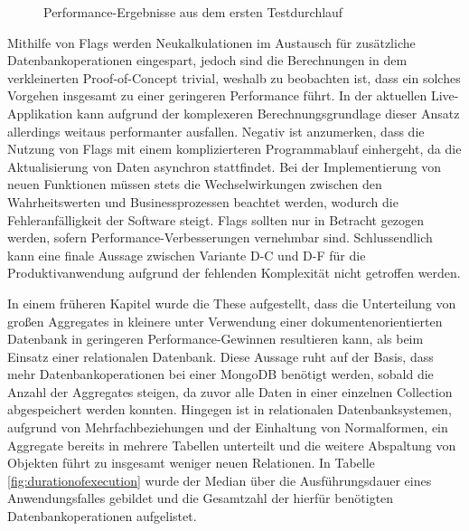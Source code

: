 \begin{figure}[htpb]
	\centering
	\footnotesize
	
	\caption{Performance-Ergebnisse aus dem ersten Testdurchlauf}
	\label{fig:PerformanceDefault}
\end{figure}

Mithilfe von Flags werden Neukalkulationen im Austausch für zusätzliche Datenbankoperationen eingespart, jedoch sind die Berechnungen in dem verkleinerten Proof-of-Concept trivial, weshalb zu beobachten ist, dass ein solches Vorgehen insgesamt zu einer geringeren Performance führt. In der aktuellen Live-Applikation kann aufgrund der komplexeren Berechnungsgrundlage dieser Ansatz allerdings weitaus performanter ausfallen. Negativ ist anzumerken, dass die Nutzung von Flags mit einem komplizierteren Programmablauf einhergeht, da die Aktualisierung von Daten asynchron stattfindet. Bei der Implementierung von neuen Funktionen müssen stets die Wechselwirkungen zwischen den Wahrheitswerten und Businessprozessen beachtet werden, wodurch die Fehleranfälligkeit der Software steigt. Flags sollten nur in Betracht gezogen werden, sofern Performance-Verbesserungen vernehmbar sind. Schlussendlich kann eine finale Aussage zwischen Variante D-C und D-F für die Produktivanwendung aufgrund der fehlenden Komplexität nicht getroffen werden.

In einem früheren Kapitel wurde die These aufgestellt, dass die Unterteilung von großen Aggregates in kleinere unter Verwendung einer dokumentenorientierten Datenbank in geringeren Performance-Gewinnen resultieren kann, als beim Einsatz einer relationalen Datenbank. Diese Aussage ruht auf der Basis, dass mehr Datenbankoperationen bei einer MongoDB benötigt werden, sobald die Anzahl der Aggregates steigen, da zuvor alle Daten in einer einzelnen Collection abgespeichert werden konnten. Hingegen ist in relationalen Datenbanksystemen, aufgrund von Mehrfachbeziehungen und der Einhaltung von Normalformen, ein Aggregate bereits in mehrere Tabellen unterteilt und die weitere Abspaltung von Objekten führt zu insgesamt weniger neuen Relationen. In Tabelle \ref{fig:durationofexecution} wurde der Median über die Ausführungsdauer eines Anwendungsfalles gebildet und die Gesamtzahl der hierfür benötigten Datenbankoperationen aufgelistet. 

